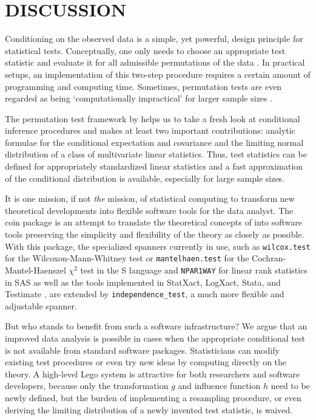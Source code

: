 \documentclass{article}
\newcommand{\Rpackage}[1]{{\normalfont\fontseries{b}\selectfont #1}}
\newcommand{\Rcmd}[1]{\texttt{#1}}
\renewcommand{\S}{\textsf{S}}
\begin{document}
\section{DISCUSSION}

Conditioning on the observed data is a simple, yet powerful, design
principle for statistical tests. Conceptually, one only needs to choose
an appropriate test statistic and evaluate it for all admissible 
permutations of the data \citep[][gives some examples]{Ernst2004}. 
In practical setups, an implementation of this
two-step procedure requires a certain amount of programming 
and computing time. Sometimes, permutation tests are even regarded 
as being `computationally impractical'
for larger sample sizes \citep{BalkinMallows2001}. 

The permutation test framework by \cite{StrasserWeber1999} helps us to take
a fresh look at conditional inference procedures and makes at least 
two important contributions: analytic formulae for the 
conditional expectation and covariance and the limiting normal distribution
of a class of multivariate linear statistics. Thus, test statistics can be
defined for appropriately standardized linear statistics and a fast
approximation of the conditional distribution is available, 
especially for large sample sizes. 

It is one mission, if not \textit{the} mission, of statistical computing to
transform new theoretical developments into flexible software tools for the
data analyst. The \Rpackage{coin} package is an attempt to translate 
the theoretical concepts of \cite{StrasserWeber1999} into software tools 
preserving the simplicity and flexibility of 
the theory as closely as possible. With this package, the specialized spanners
currently in use,
such as \Rcmd{wilcox.test} for the Wilcoxon-Mann-Whitney test or
\Rcmd{mantelhaen.test} for the Cochran-Mantel-Haenszel $\chi^2$ test in the 
\S{} language and \texttt{NPAR1WAY} for linear rank statistics in \textsf{SAS}
as well as the tools implemented in \textsf{StatXact}, \textsf{LogXact},
\textsf{Stata}, and \textsf{Testimate} 
\citep[see][for an overview]{Oster2002,Oster2003},
are extended by \Rcmd{independence\_test}, a much more flexible and 
adjustable spanner.

But who stands to benefit from such a software infrastructure? We argue 
that an improved data analysis is possible in cases when the appropriate 
conditional test is not available from standard software packages.
Statisticians can modify existing test procedures or even try new ideas by
computing directly on the theory. A high-level Lego system is attractive for
both researchers and software developers, because only the transformation $g$ and influence
function $h$ need to be newly defined, but the burden of implementing a
resampling procedure, or even deriving the limiting distribution of a newly
invented test statistic, is waived. 
\end{document}
